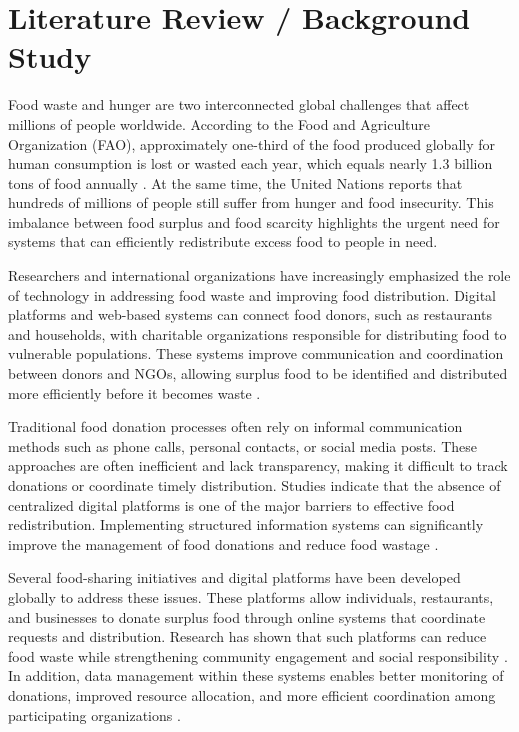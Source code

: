 \vspace{20pt}
\section{Literature Review / Background Study}

Food waste and hunger are two interconnected global challenges that affect millions of people worldwide. According to the Food and Agriculture Organization (FAO), approximately one-third of the food produced globally for human consumption is lost or wasted each year, which equals nearly 1.3 billion tons of food annually \cite{gustavsson2011global}. At the same time, the United Nations reports that hundreds of millions of people still suffer from hunger and food insecurity. This imbalance between food surplus and food scarcity highlights the urgent need for systems that can efficiently redistribute excess food to people in need.

Researchers and international organizations have increasingly emphasized the role of technology in addressing food waste and improving food distribution. Digital platforms and web-based systems can connect food donors, such as restaurants and households, with charitable organizations responsible for distributing food to vulnerable populations. These systems improve communication and coordination between donors and NGOs, allowing surplus food to be identified and distributed more efficiently before it becomes waste \cite{forbes2021food}.

Traditional food donation processes often rely on informal communication methods such as phone calls, personal contacts, or social media posts. These approaches are often inefficient and lack transparency, making it difficult to track donations or coordinate timely distribution. Studies indicate that the absence of centralized digital platforms is one of the major barriers to effective food redistribution. Implementing structured information systems can significantly improve the management of food donations and reduce food wastage \cite{michelini2018understanding}.

Several food-sharing initiatives and digital platforms have been developed globally to address these issues. These platforms allow individuals, restaurants, and businesses to donate surplus food through online systems that coordinate requests and distribution. Research has shown that such platforms can reduce food waste while strengthening community engagement and social responsibility \cite{papargyropoulou2014food}. In addition, data management within these systems enables better monitoring of donations, improved resource allocation, and more efficient coordination among participating organizations \cite{atukunda2021unlocking}.


